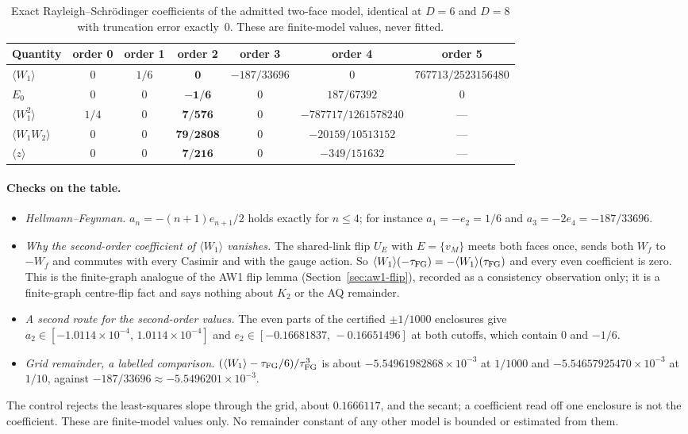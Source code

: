 \begin{table}[htbp]
\centering\small
\caption{Exact Rayleigh--Schr\"odinger coefficients of the admitted two-face
model, identical at $D=6$ and $D=8$ with truncation error exactly~0. These
are finite-model values, never fitted.}
\label{tab:az2-coefficients}
\begin{tabular}{@{}lcccccc@{}}
\toprule
Quantity & order 0 & order 1 & order 2 & order 3 & order 4 & order 5\\
\midrule
$\langle W_1\rangle$ & $0$ & $1/6$ & $\mathbf{0}$ & $-187/33696$ & $0$ & $767713/2523156480$\\
$E_0$ & $0$ & $0$ & $\mathbf{-1/6}$ & $0$ & $187/67392$ & $0$\\
$\langle W_1^2\rangle$ & $1/4$ & $0$ & $\mathbf{7/576}$ & $0$ & $-787717/1261578240$ & ---\\
$\langle W_1W_2\rangle$ & $0$ & $0$ & $\mathbf{79/2808}$ & $0$ & $-20159/10513152$ & ---\\
$\langle z\rangle$ & $0$ & $0$ & $\mathbf{7/216}$ & $0$ & $-349/151632$ & ---\\
\bottomrule
\end{tabular}
\end{table}

\paragraph{Checks on the table.}
\begin{itemize}
\item \emph{Hellmann--Feynman.} $a_n=-(n+1)e_{n+1}/2$ holds exactly for
 $n\le4$; for instance $a_1=-e_2=1/6$ and $a_3=-2e_4=-187/33696$.
\item \emph{Why the second-order coefficient of $\langle W_1\rangle$
 vanishes.} The shared-link flip $U_E$ with $E=\{v_M\}$ meets both faces once,
 sends both $W_f$ to $-W_f$ and commutes with every Casimir and with the gauge
 action. So $\langle W_1\rangle(-\tau_{\mathrm{FG}})=-\langle W_1\rangle(\tau_{\mathrm{FG}})$ and every
 even coefficient is zero. This is the finite-graph analogue of the AW1 flip
 lemma (Section~\ref{sec:aw1-flip}), recorded as a consistency observation
 only; it is a finite-graph centre-flip fact and says nothing about $K_2$ or
 the AQ remainder.
\item \emph{A second route for the second-order values.} The even parts of the
 certified $\pm1/1000$ enclosures give $a_2\in[-1.0114\times10^{-4},\,
 1.0114\times10^{-4}]$ and $e_2\in[-0.16681837,\,-0.16651496]$ at both
 cutoffs, which contain $0$ and $-1/6$.
\item \emph{Grid remainder, a labelled comparison.}
 $(\langle W_1\rangle-\tau_{\mathrm{FG}}/6)/\tau_{\mathrm{FG}}^3$ is about $-5.54961982868\times10^{-3}$
 at $1/1000$ and $-5.54657925470\times10^{-3}$ at $1/10$, against
 $-187/33696\approx-5.5496201\times10^{-3}$.
\end{itemize}
The control  rejects the least-squares slope
through the grid, about $0.1666117$, and the secant; a coefficient read off
one enclosure is not the coefficient. These are finite-model values only. No
remainder constant of any other model is bounded or estimated from them.

